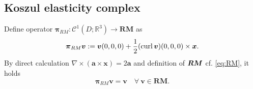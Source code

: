 \subsection{Koszul elasticity complex}

Define operator $\boldsymbol \pi_{RM}: \mathcal C^1(D; \mathbb R^3)\to \boldsymbol{RM}$ as
\[
\boldsymbol \pi_{RM}\boldsymbol  v:=\boldsymbol  v(0,0,0)+\frac{1}{2}(\operatorname{curl}\boldsymbol  v)(0,0,0)\times\boldsymbol  x.
\]
By direct calculation $\nabla \times (\boldsymbol  a \times \boldsymbol  x) = 2\boldsymbol  a$ and definition of $\boldsymbol{RM}$ cf. \eqref{eq:RM}, it holds
\begin{equation}\label{eq:piRMprop}
\boldsymbol \pi_{RM}\boldsymbol  v=\boldsymbol  v\quad \forall~\boldsymbol  v\in\boldsymbol{RM}.
\end{equation}

